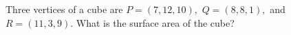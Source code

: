 Three vertices of a cube are $P=(7,12,10),$ $Q=(8,8,1),$ and $R=(11,3,9).$ What is the surface area of the cube?